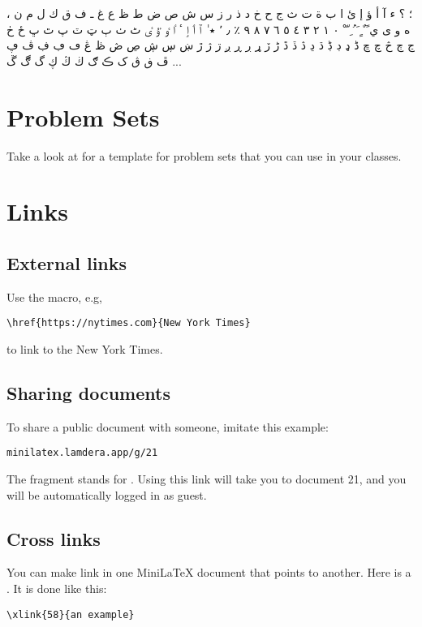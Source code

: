 ، ؛ ؟ ء آ أ ؤ إ ئ ا ب ة ت ث ج ح خ د ذ ر ز س ش ص ض ط ظ ع غ ـ ف ق ك ل م ن ه و ى ي ً ٌ ٍ َ ُ ِ ّ ْ ٠ ١ ٢ ٣ ٤ ٥ ٦ ٧ ٨ ٩ ٪ ٫ ٬ ٭ ٰ ٱ ٲ ٳ ٴ ٵ ٶ ٷ ٸ ٹ ٺ ٻ ټ ٽ پ ٿ ڀ ځ ڂ ڃ ڄ څ چ ڇ ڈ ډ ڊ ڋ ڌ ڍ ڎ ڏ ڐ ڑ ڒ ړ ڔ ڕ ږ ڗ ژ ڙ ښ ڛ ڜ ڝ ڞ ڟ ڠ ڡ ڢ ڣ ڤ ڥ ڦ ڧ ڨ ک ڪ ګ ڬ ڭ ڮ گ ڰ ڱ ...


\section{Problem Sets}

Take a look at  for a template for problem sets that you can use in your classes.

\section{Links}

\subsection{External links}

Use the  macro, e.g,

\begin{verbatim}
\href{https://nytimes.com}{New York Times}
\end{verbatim}

to link to the New York Times.

\subsection{Sharing documents}

To share a public document with someone, imitate this example:

\begin{verbatim}
minilatex.lamdera.app/g/21
\end{verbatim}

The  fragment  stands for .  Using this link will take you to document 21, and you will be automatically logged in as guest.


\subsection{Cross links}

You can make link in one MiniLaTeX document that points to another.
Here is a . It is done like this:

\begin{verbatim}
\xlink{58}{an example}
\end{verbatim}


